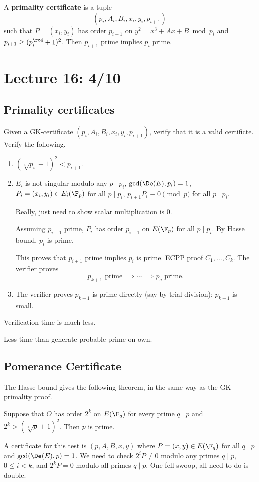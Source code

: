 \begin{df}
A \textbf{primality certificate} is a tuple
\[
(p_i,A_i,B_i,x_i,y_i,p_{i+1})
\]
such that $P=(x_i,y_i)$ has order $p_{i+1}$ on $y^2=x^3+Ax+B\bmod{p_i}$ and $p_{i+1}\ge (p_i^{\rc 4}+1)^2$. Then $p_{i+1}$ prime implies $p_i$ prime.
\end{df}
\section{Lecture 16: 4/10}
\subsection{Primality certificates}
Given a GK-certificate $(p_i,A_i,B_i,x_i,y_i,p_{i+1})$, verify that it is a valid certificte.
Verify the following.
\begin{enumerate}
\item
$(\sqrt[4]{p_i}+1)^2< p_{i+1}$.
\item
$E_i$ is not singular modulo any $p\mid p_i$, $\gcd(\De(E),p_i)=1$, $P_i=(x_i,y_i)\in E_i(\F_p)$ for all $p\mid p_i$, $p_{i+1}P_i\equiv 0\pmod p$ for all $p\mid p_i$. 

Really, just need to show  scalar multiplication is 0.

Assuming $p_{i+1}$ prime, $P_i$ has order $p_{i+1}$ on $E(\F_p)$ for all $p\mid p_i$. By Hasse bound, $p_i$ is prime.

This proves that $p_{i+1}$ prime implies $p_i$ is prime. ECPP proof $C_1,\ldots, C_k$. The verifier proves
\[
p_{k+1}\text{ prime}\implies \cdots \implies p_q\text{ prime}.
\]
\item
The verifier proves $p_{k+1}$ is prime directly (say by trial division); $p_{k+1}$ is small.
\end{enumerate}
Verification time is much less.

Less time than generate probable prime on own.
\subsection{Pomerance Certificate}
The Hasse bound gives the following theorem, in the same way as the GK primality proof.
\begin{thm}
Suppose that $O$ has order $2^k$ on $E(\F_q)$ for every prime $q\mid p$ and $2^k>(\sqrt[4]p+1)^2$. Then $p$ is prime.
\end{thm}
A certificate for this test is $(p,A,B,x,y)$ where $P=(x,y)\in E(\F_q)$ for all $q\mid p$ and $\gcd(\De(E),p)=1$. We need to check $2^iP\ne 0$ modulo any primes $q\mid p$, $0\le i<k$, and $2^kP=0$ modulo all primes $q\mid p$. One fell swoop, all need to do is double.

